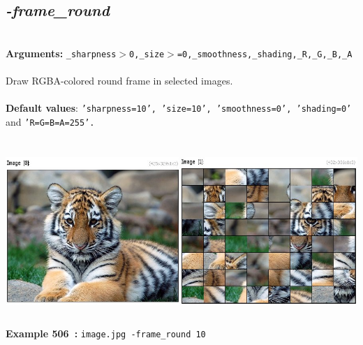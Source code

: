 \documentclass[a4paper,11pt,twoside]{book}
\begin{document}
\subsection{\emph{-frame\_round} }\vspace*{-0.5em}
~\\\textbf{Arguments: } 
{\small \texttt{\_sharpness$>$0,\_size$>$=0,\_smoothness,\_shading,\_R,\_G,\_B,\_A}}\\~\\
Draw RGBA-colored round frame in selected images.
~\\~\\\textbf{Default values}: {\small \texttt{'sharpness=10', 'size=10', 'smoothness=0', 'shading=0'} and \texttt{'R=G=B=A=255'.}}
\begin{center}\includegraphics[keepaspectratio=true,height=7cm,width=\textwidth]{img/gmic_def506.jpg}\\
{\footnotesize \textbf{Example 506~:} \texttt{image.jpg -frame\_round 10}}
\end{center}
\end{document}
